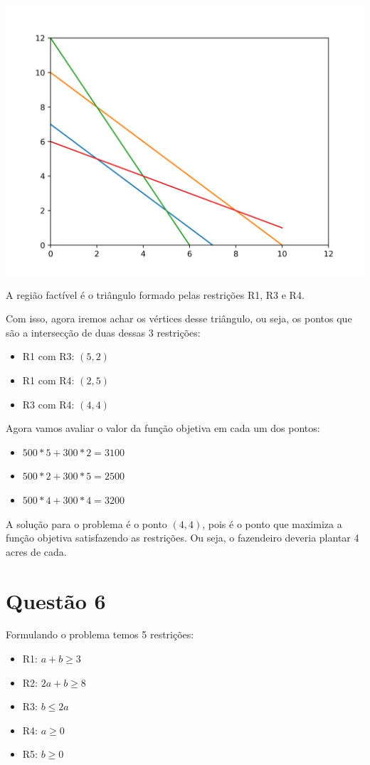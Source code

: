 \documentclass[11pt]{article}
\begin{document}
\begin{center}
\includegraphics[width=.9\linewidth]{q5.png}
\end{center}
A região factível é o triângulo formado pelas restrições R1, R3 e R4.

Com isso, agora iremos achar os vértices desse triângulo, ou seja, os pontos
que são a intersecção de duas dessas 3 restrições:

\begin{itemize}
\item R1 com R3: \((5, 2)\)
\item R1 com R4: \((2, 5)\)
\item R3 com R4: \((4, 4)\)
\end{itemize}

Agora vamos avaliar o valor da função objetiva em cada um dos pontos:

\begin{itemize}
\item \(500*5+300*2 = 3100\)
\item \(500*2+300*5 = 2500\)
\item \(500*4+300*4 = 3200\)
\end{itemize}

A solução para o problema é o ponto \((4, 4)\), pois é o ponto que maximiza a função objetiva
satisfazendo as restrições. Ou seja, o fazendeiro deveria plantar 4 acres de cada.\newpage
\section{Questão 6}
\label{sec:orgb410b8c}
Formulando o problema temos 5 restrições:
\begin{itemize}
\item R1: \(a+b \geq 3\)
\item R2: \(2a+b \geq 8\)
\item R3: \(b \leq 2a\)
\item R4: \(a \geq 0\)
\item R5: \(b \geq 0\)
\end{itemize}
\end{document}
